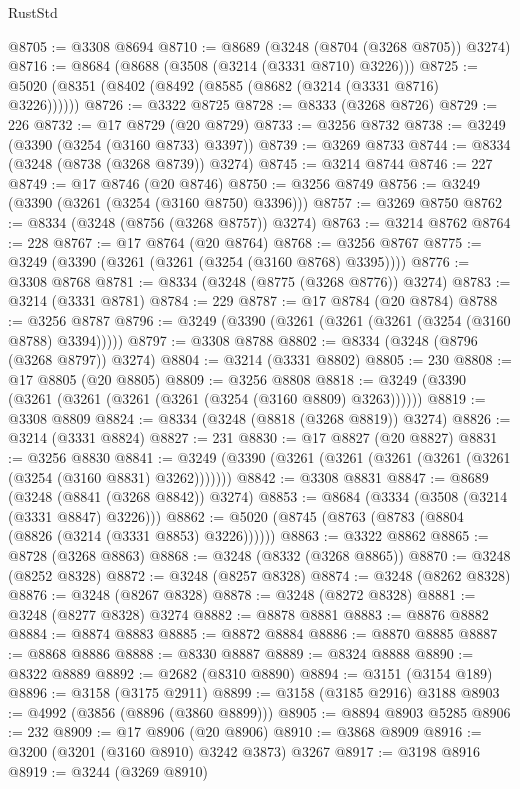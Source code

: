 \begin{lexlean}{RustStd}
\begin{coremodule}
{\begin{coremodule}
{{{{{{{{{{{{{{{{{{{{{{{{{@8705 := @3308 @8694
@8710 := @8689 (@3248 (@8704 (@3268 @8705)) @3274)
@8716 := @8684 (@8688 (@3508 (@3214 (@3331 @8710) @3226)))
@8725 := @5020 (@8351 (@8402 (@8492 (@8585 (@8682 (@3214 (@3331 @8716) @3226))))))
@8726 := @3322 @8725
@8728 := @8333 (@3268 @8726)
@8729 := 226
@8732 := @17 @8729 (@20 @8729)
@8733 := @3256 @8732
@8738 := @3249 (@3390 (@3254 (@3160 @8733) @3397))
@8739 := @3269 @8733
@8744 := @8334 (@3248 (@8738 (@3268 @8739)) @3274)
@8745 := @3214 @8744
@8746 := 227
@8749 := @17 @8746 (@20 @8746)
@8750 := @3256 @8749
@8756 := @3249 (@3390 (@3261 (@3254 (@3160 @8750) @3396)))
@8757 := @3269 @8750
@8762 := @8334 (@3248 (@8756 (@3268 @8757)) @3274)
@8763 := @3214 @8762
@8764 := 228
@8767 := @17 @8764 (@20 @8764)
@8768 := @3256 @8767
@8775 := @3249 (@3390 (@3261 (@3261 (@3254 (@3160 @8768) @3395))))
@8776 := @3308 @8768
@8781 := @8334 (@3248 (@8775 (@3268 @8776)) @3274)
@8783 := @3214 (@3331 @8781)
@8784 := 229
@8787 := @17 @8784 (@20 @8784)
@8788 := @3256 @8787
@8796 := @3249 (@3390 (@3261 (@3261 (@3261 (@3254 (@3160 @8788) @3394)))))
@8797 := @3308 @8788
@8802 := @8334 (@3248 (@8796 (@3268 @8797)) @3274)
@8804 := @3214 (@3331 @8802)
@8805 := 230
@8808 := @17 @8805 (@20 @8805)
@8809 := @3256 @8808
@8818 := @3249 (@3390 (@3261 (@3261 (@3261 (@3261 (@3254 (@3160 @8809) @3263))))))
@8819 := @3308 @8809
@8824 := @8334 (@3248 (@8818 (@3268 @8819)) @3274)
@8826 := @3214 (@3331 @8824)
@8827 := 231
@8830 := @17 @8827 (@20 @8827)
@8831 := @3256 @8830
@8841 := @3249 (@3390 (@3261 (@3261 (@3261 (@3261 (@3261 (@3254 (@3160 @8831) @3262)))))))
@8842 := @3308 @8831
@8847 := @8689 (@3248 (@8841 (@3268 @8842)) @3274)
@8853 := @8684 (@3334 (@3508 (@3214 (@3331 @8847) @3226)))
@8862 := @5020 (@8745 (@8763 (@8783 (@8804 (@8826 (@3214 (@3331 @8853) @3226))))))
@8863 := @3322 @8862
@8865 := @8728 (@3268 @8863)
@8868 := @3248 (@8332 (@3268 @8865))
@8870 := @3248 (@8252 @8328)
@8872 := @3248 (@8257 @8328)
@8874 := @3248 (@8262 @8328)
@8876 := @3248 (@8267 @8328)
@8878 := @3248 (@8272 @8328)
@8881 := @3248 (@8277 @8328) @3274
@8882 := @8878 @8881
@8883 := @8876 @8882
@8884 := @8874 @8883
@8885 := @8872 @8884
@8886 := @8870 @8885
@8887 := @8868 @8886
@8888 := @8330 @8887
@8889 := @8324 @8888
@8890 := @8322 @8889
@8892 := @2682 (@8310 @8890)
@8894 := @3151 (@3154 @189)
@8896 := @3158 (@3175 @2911)
@8899 := @3158 (@3185 @2916) @3188
@8903 := @4992 (@3856 (@8896 (@3860 @8899)))
@8905 := @8894 @8903 @5285
@8906 := 232
@8909 := @17 @8906 (@20 @8906)
@8910 := @3868 @8909
@8916 := @3200 (@3201 (@3160 @8910) @3242 @3873) @3267
@8917 := @3198 @8916
@8919 := @3244 (@3269 @8910)
}}}}}}}}}}}}}}}}}}}}}}}}}
\end{coremodule}}
\end{coremodule}
\end{lexlean}
